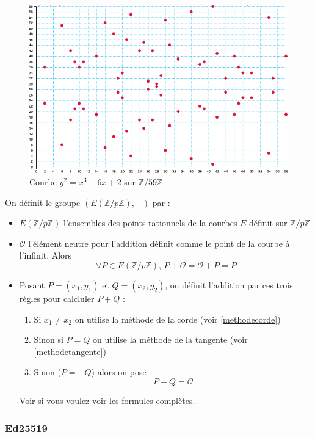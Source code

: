 \documentclass[a4paper, 12pt]{article}
\begin{document}
\begin{figure}[h]
	\centering
	\includegraphics[width=.8\textwidth]{img/courbezpz.png}
	\caption{Courbe $y^2 = x^3 -6x + 2$ sur $ \mathbb{Z}/59\mathbb{Z}$}
	\label{courbezpz}
\end{figure}



\noindent On définit le groupe $\left(E\left( \mathbb{Z}/p\mathbb{Z} \right), +\right)$ par :
\begin{itemize}
	\item $E\left( \mathbb{Z}/p\mathbb{Z} \right)$ l'ensembles des points rationnels de la courbes $E$ définit sur $\mathbb{Z}/p\mathbb{Z}$
	\item $\mathcal{O}$ l'élément neutre pour l'addition définit comme le point de la courbe à l'infinit. Alors
		$$
		\forall P \in E\left( \mathbb{Z}/p\mathbb{Z} \right), \, P + \mathcal{O} = \mathcal{O}+P=P
		$$
	\item Posant $P = (x_1, y_1)$ et $Q = (x_2, y_2)$, on définit l'addition par ces trois règles pour calcluler $P+Q$ :
	\begin{enumerate}
		\item Si $x_1 \neq x_2$ on utilise la méthode de la corde (voir \ref{methodecorde})
		\item Sinon si $P = Q$ on utilise la méthode de la tangente (voir \ref{methodetangente})
		\item Sinon ($P = -Q$) alors on pose 
		$$
		P+Q = \mathcal{O}
		$$
	\end{enumerate}
	Voir \cite{courslong} si vous voulez voir les formules complètes.
\end{itemize}


\subsubsection{Ed25519}\label{courbeed}
\end{document}
